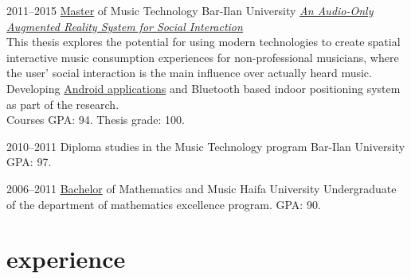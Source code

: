 \documentclass[]{friggeri-cv}  %
\begin{document}
\begin{entrylist}

    \entry
    {2011--2015}
    {\href{http://www.tomgurion.me/pdfs/MA.pdf}{Master} {\normalfont of Music Technology}}
    {Bar-Ilan University}
    {\href{http://www.tomgurion.me/an-audio-only-augmented-reality-system-for-social-interaction.html}{\emph{An Audio-Only Augmented Reality System for Social Interaction}}\\
    This thesis explores the potential for using modern technologies to create spatial interactive music consumption experiences for non-professional musicians, where the user' social interaction is the main influence over actually heard music.\\
    Developing \href{https://github.com/Nagasaki45/ScenePlayer-Plus/}{Android applications} and Bluetooth based indoor positioning system as part of the research.\\
    Courses GPA: 94. Thesis grade: 100.}

\end{entrylist}
\begin{entrylist}

    \entry
    {2010--2011}
    {Diploma studies {\normalfont in the Music Technology program}}
    {Bar-Ilan University}
    {GPA: 97.}

\end{entrylist}
\begin{entrylist}

    \entry
    {2006--2011}
    {\href{http://www.tomgurion.me/pdfs/BSc.pdf}{Bachelor} {\normalfont of Mathematics and Music}}
    {Haifa University}
    {Undergraduate of the department of mathematics excellence program. GPA: 90.}

\end{entrylist}


\section{experience}
\end{document}
